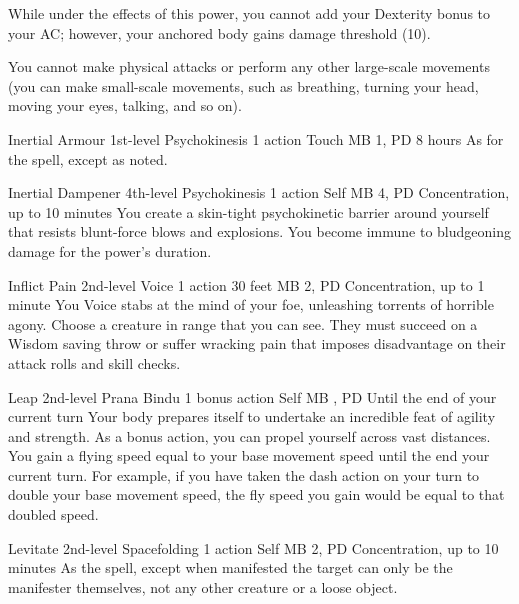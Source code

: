 While under the effects of this power,
you cannot add your Dexterity bonus to your AC;
however, your anchored body gains damage threshold (10).

You cannot make physical attacks
or perform any other large-scale movements
(you can make small-scale movements,
such as breathing,
turning your head,
moving your eyes,
talking, and so on).

\DndPowerHeader%
  {Inertial Armour}
  {1st-level Psychokinesis}
  {1 action}
  {Touch}
  {MB 1, PD \lvlone}
  {8 hours}
As for the  spell, except as noted.

\DndPowerHeader%
  {Inertial Dampener}
  {4th-level Psychokinesis}
  {1 action}
  {Self}
  {MB 4, PD \lvlfour}
  {Concentration, up to 10 minutes}
You create a skin-tight psychokinetic barrier around yourself
that resists blunt-force blows and explosions.
You become immune to bludgeoning damage for the power's duration.

\DndPowerHeader%
  {Inflict Pain}
  {2nd-level Voice}
  {1 action}
  {30 feet}
  {MB 2, PD \lvltwo}
  {Concentration, up to 1 minute}
You Voice stabs at the mind of your foe,
unleashing torrents of horrible agony.
Choose a creature in range that you can see.
They must succeed on a Wisdom saving throw or
suffer wracking pain that imposes disadvantage on
their attack rolls and skill checks.

\DndPowerHeader%
  {Leap}
  {2nd-level Prana Bindu}
  {1 bonus action}
  {Self}
  {MB , PD \lvltwo}
  {Until the end of your current turn}
Your body prepares itself to undertake an incredible feat
of agility and strength.
As a bonus action,
you can propel yourself across vast distances.
You gain a flying speed equal to your base movement speed
until the end your current turn.
For example,
if you have taken the dash action on your turn to double
your base movement speed,
the fly speed you gain would be equal to that doubled speed.
 
\DndPowerHeader%
  {Levitate}
  {2nd-level Spacefolding}
  {1 action}
  {Self}
  {MB 2, PD \lvltwo}
  {Concentration, up to 10 minutes}
As the  spell,
except when manifested the target can only be the manifester themselves,
not any other creature or a loose object.

